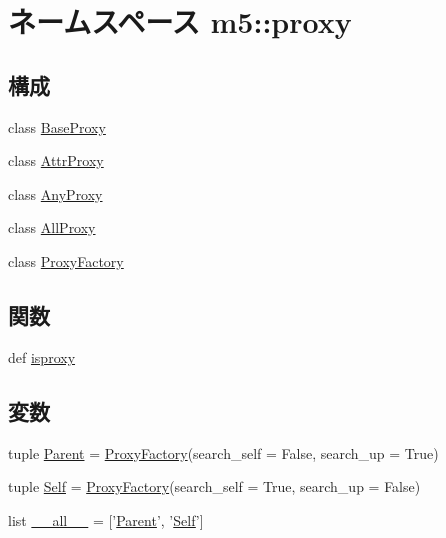 \hypertarget{namespacem5_1_1proxy}{
\section{ネームスペース m5::proxy}
\label{namespacem5_1_1proxy}
}
\subsection*{構成}
\begin{DoxyCompactItemize}
\item 
class \hyperlink{classm5_1_1proxy_1_1BaseProxy}{BaseProxy}
\item 
class \hyperlink{classm5_1_1proxy_1_1AttrProxy}{AttrProxy}
\item 
class \hyperlink{classm5_1_1proxy_1_1AnyProxy}{AnyProxy}
\item 
class \hyperlink{classm5_1_1proxy_1_1AllProxy}{AllProxy}
\item 
class \hyperlink{classm5_1_1proxy_1_1ProxyFactory}{ProxyFactory}
\end{DoxyCompactItemize}
\subsection*{関数}
\begin{DoxyCompactItemize}
\item 
def \hyperlink{namespacem5_1_1proxy_aa1486288b33bd09a0b79388e44c74d63}{isproxy}
\end{DoxyCompactItemize}
\subsection*{変数}
\begin{DoxyCompactItemize}
\item 
tuple \hyperlink{namespacem5_1_1proxy_ad1553f66f41fc2322bd24baa73f22989}{Parent} = \hyperlink{classm5_1_1proxy_1_1ProxyFactory}{ProxyFactory}(search\_\-self = False, search\_\-up = True)
\item 
tuple \hyperlink{namespacem5_1_1proxy_ac97d41c251a0e0685534d109e66e63d5}{Self} = \hyperlink{classm5_1_1proxy_1_1ProxyFactory}{ProxyFactory}(search\_\-self = True, search\_\-up = False)
\item 
list \hyperlink{namespacem5_1_1proxy_aa4a022e6ddacd362b83964da5cc5d044}{\_\-\_\-all\_\-\_\-} = \mbox{[}'\hyperlink{namespacem5_1_1proxy_ad1553f66f41fc2322bd24baa73f22989}{Parent}', '\hyperlink{namespacem5_1_1proxy_ac97d41c251a0e0685534d109e66e63d5}{Self}'\mbox{]}
\end{DoxyCompactItemize}


